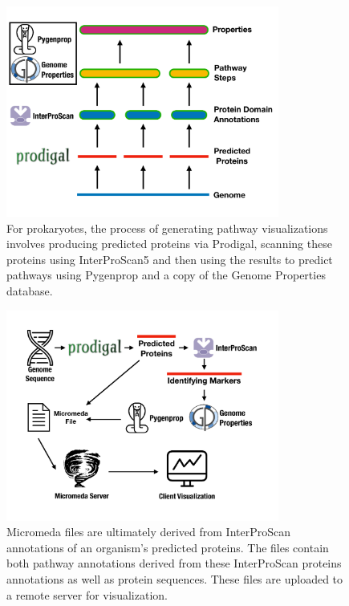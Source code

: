 \begin{figure}[!ht]
  \centering
	\includegraphics[width=0.8\textwidth]{media/micromeda-pipeline.pdf}
	 \caption{For prokaryotes, the process of generating pathway visualizations involves producing predicted proteins via Prodigal, scanning these proteins using InterProScan5 and then using the results to predict pathways using Pygenprop and a copy of the Genome Properties database.}
	 \label{fig:micromeda-levels}
\end{figure}

\begin{figure}[!ht]
  \centering
	\includegraphics[width=0.8\textwidth]{media/how-micromeda-files-are-built.pdf}
	 \caption{Micromeda files are ultimately derived from InterProScan annotations of an organism's predicted proteins. The files contain both pathway annotations derived from these InterProScan proteins annotations as well as protein sequences. These files are uploaded to a remote server for visualization.}
	 \label{fig:micromeda-file-building-and-use}
\end{figure}

